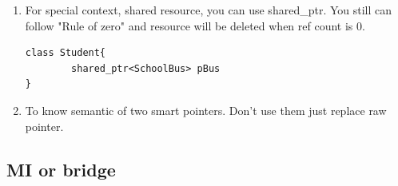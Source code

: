 \documentclass[a4paper,11pt,twoside]{book}
\begin{document}
\begin{itemize}
\begin{enumerate}
		\item For special context, shared resource, you can use shared\_ptr.  You still can follow "Rule of zero" and resource will be deleted when ref count is 0.
\begin{lstlisting}[numbers=none]
class Student{
		shared_ptr<SchoolBus> pBus
}
\end{lstlisting}
		
		\item To know semantic of two smart pointers. Don't use them just replace raw pointer.
	\end{enumerate}
	
\end{itemize}

\subsection{MI or bridge}
\end{document}
